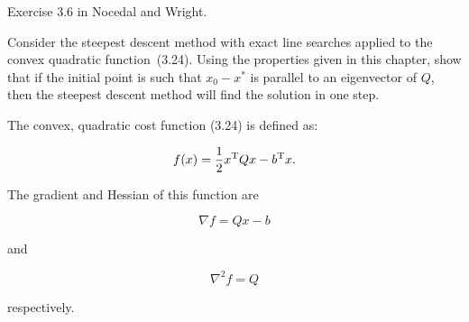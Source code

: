 \begin{problem}
  Exercise 3.6 in Nocedal and Wright.
  
  Consider the steepest descent method with exact line searches applied to the convex quadratic function~(3.24). Using the properties given in this chapter, show that if the initial point is such that ${x_0 - x^{*}}$ is parallel to an eigenvector of $Q$, then the steepest descent method will find the solution in one step.
\end{problem}

The convex, quadratic cost function (3.24) is defined as:

\[ f(x) = \frac{1}{2} x^{\textrm{T}} Q x - b^{\textrm{T}} x \textrm{.} \]

\noindent
The gradient and Hessian of this function are 

\[ \nabla f = Q x - b  \]

\noindent
and

\[ \nabla^2 f = Q \]

\noindent
respectively.
